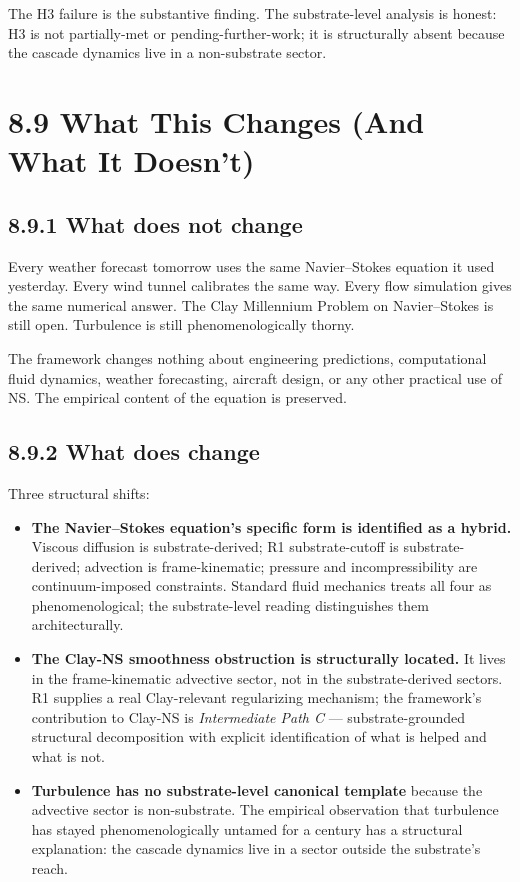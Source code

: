\documentclass[11pt]{book}
\begin{document}
The H3 failure is the substantive finding. The substrate-level analysis is honest: H3 is not partially-met or pending-further-work; it is structurally absent because the cascade dynamics live in a non-substrate sector.

\section{8.9 What This Changes (And What It Doesn't)}

\subsection{8.9.1 What does not change}

Every weather forecast tomorrow uses the same Navier–Stokes equation it used yesterday. Every wind tunnel calibrates the same way. Every flow simulation gives the same numerical answer. The Clay Millennium Problem on Navier–Stokes is still open. Turbulence is still phenomenologically thorny.

The framework changes nothing about engineering predictions, computational fluid dynamics, weather forecasting, aircraft design, or any other practical use of NS. The empirical content of the equation is preserved.

\subsection{8.9.2 What does change}

Three structural shifts:

\begin{itemize}
\item \textbf{The Navier–Stokes equation's specific form is identified as a hybrid.} Viscous diffusion is substrate-derived; R1 substrate-cutoff is substrate-derived; advection is frame-kinematic; pressure and incompressibility are continuum-imposed constraints. Standard fluid mechanics treats all four as phenomenological; the substrate-level reading distinguishes them architecturally.
\item \textbf{The Clay-NS smoothness obstruction is structurally located.} It lives in the frame-kinematic advective sector, not in the substrate-derived sectors. R1 supplies a real Clay-relevant regularizing mechanism; the framework's contribution to Clay-NS is \textit{Intermediate Path C} — substrate-grounded structural decomposition with explicit identification of what is helped and what is not.
\item \textbf{Turbulence has no substrate-level canonical template} because the advective sector is non-substrate. The empirical observation that turbulence has stayed phenomenologically untamed for a century has a structural explanation: the cascade dynamics live in a sector outside the substrate's reach.
\end{itemize}
\end{document}
